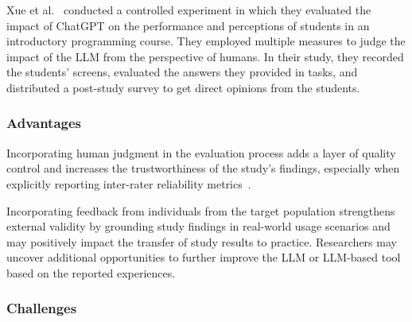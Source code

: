 Xue et al.~\cite{DBLP:conf/icse/XueCBTH24} conducted a controlled experiment in which they evaluated the impact of ChatGPT on the performance and perceptions of students in an introductory programming course.
They employed multiple measures to judge the impact of the LLM from the perspective of humans.
In their study, they recorded the students' screens, evaluated the answers they provided in tasks, and distributed a post-study survey to get direct opinions from the students.



\subsubsection{Advantages}

Incorporating human judgment in the evaluation process adds a layer of quality control and increases the trustworthiness of the study's findings, especially when explicitly reporting inter-rater reliability metrics~\cite{khraisha2024canlargelanguagemodelshumans}.

Incorporating feedback from individuals from the target population strengthens external validity by grounding study findings in real-world usage scenarios and may positively impact the transfer of study results to practice.
Researchers may uncover additional opportunities to further improve the LLM or LLM-based tool based on the reported experiences.


\subsubsection{Challenges}

